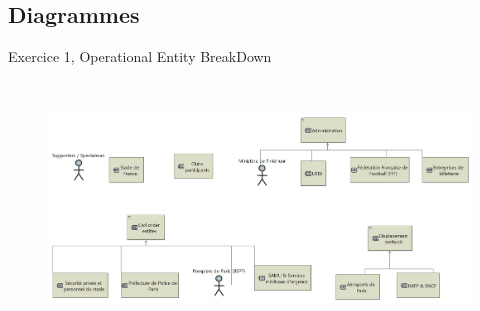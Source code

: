 \documentclass[aspectratio=1610]{beamer}
\begin{document}
    \subsection{Diagrammes}
    \begin{frame}{Exercice 1, Operational Entity BreakDown}
        \begin{figure}[H]
            \centering
            \includegraphics[width=\textwidth, height=6.75cm, keepaspectratio]{./images/EX1/CSC_5RO08_TA_EX1_OEBD.jpg}
        \end{figure}
    \end{frame}
\end{document}
